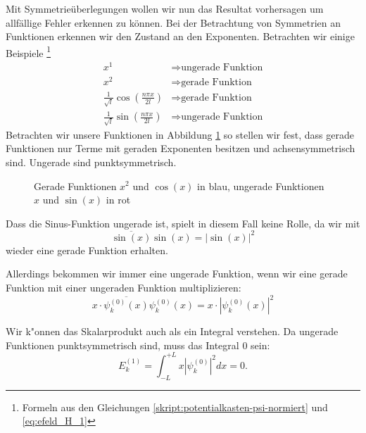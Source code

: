 \begin{refsection}
Mit Symmetrie\"uberlegungen wollen wir nun das Resultat vorhersagen um allf\"allige Fehler erkennen zu k\"onnen.
Bei der Betrachtung von Symmetrien an Funktionen erkennen wir den Zustand an den Exponenten.
Betrachten wir einige Beispiele 
\footnote{Formeln aus den Gleichungen \ref{skript:potentialkasten-psi-normiert} und \ref{eq:efeld_H_1}}
\begin{equation}
\begin{aligned}
x^1 &\Rightarrow \text{ungerade Funktion}
\\
x^2 &\Rightarrow \text{gerade Funktion}
\\
\frac{1}{\sqrt{l}}\cos\left( \frac{n \pi x}{2l} \right)  &\Rightarrow \text{gerade Funktion}
\\
\frac{1}{\sqrt{l}}\sin\left( \frac{n \pi x}{2l} \right)  &\Rightarrow \text{ungerade Funktion}
\end{aligned}
\end{equation}
Betrachten wir unsere Funktionen in Abbildung \ref{abb:efeld_gerade_ungerade} so stellen wir fest, 
dass gerade Funktionen nur Terme mit geraden Exponenten besitzen und achsensymmetrisch sind.
Ungerade sind punktsymmetrisch.

\begin{figure}
  \centering
{}
 \caption{Gerade Funktionen $x^2$ und $\cos(x)$ in blau, ungerade Funktionen $x$ und $\sin(x)$ in rot}
 \label{abb:efeld_gerade_ungerade}
\end{figure}

Dass die Sinus-Funktion ungerade ist, spielt in diesem Fall keine Rolle, da wir mit 
\[
  \overline{\sin(x)} \sin(x) = |\sin(x)|^2
\]
wieder eine gerade Funktion erhalten.

Allerdings bekommen wir immer eine ungerade Funktion, wenn wir eine gerade Funktion mit einer ungeraden Funktion multiplizieren:
\[ 
  x \cdot \overline{\psi_k^{(0)}(x)} \psi_k^{(0)}(x) = x \cdot |\psi_k^{(0)}(x)|^2
\]

Wir k"onnen das Skalarprodukt auch als ein Integral verstehen.
Da ungerade Funktionen punktsymmetrisch sind, muss das Integral $0$ sein:
\[
  E_k^{(1)} = \int_{-L}^{+L} x |\psi_k^{(0)}|^2 dx = 0 .
\]


\end{refsection}
